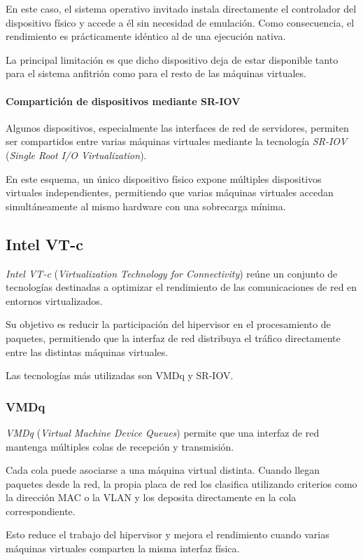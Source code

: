 En este caso, el sistema operativo invitado instala directamente el controlador del dispositivo físico y accede a él sin necesidad de emulación. Como consecuencia, el rendimiento es prácticamente idéntico al de una ejecución nativa.

La principal limitación es que dicho dispositivo deja de estar disponible tanto para el sistema anfitrión como para el resto de las máquinas virtuales.

\paragraph{Compartición de dispositivos mediante SR-IOV}
Algunos dispositivos, especialmente las interfaces de red de servidores, permiten ser compartidos entre varias máquinas virtuales mediante la tecnología \textit{SR-IOV} (\textit{Single Root I/O Virtualization}).

En este esquema, un único dispositivo físico expone múltiples dispositivos virtuales independientes, permitiendo que varias máquinas virtuales accedan simultáneamente al mismo hardware con una sobrecarga mínima.

\subsection{Intel VT-c}

\textit{Intel VT-c} (\textit{Virtualization Technology for Connectivity}) reúne un conjunto de tecnologías destinadas a optimizar el rendimiento de las comunicaciones de red en entornos virtualizados.

Su objetivo es reducir la participación del hipervisor en el procesamiento de paquetes, permitiendo que la interfaz de red distribuya el tráfico directamente entre las distintas máquinas virtuales.

Las tecnologías más utilizadas son VMDq y SR-IOV.

\subsubsection{VMDq}

\textit{VMDq} (\textit{Virtual Machine Device Queues}) permite que una interfaz de red mantenga múltiples colas de recepción y transmisión.

Cada cola puede asociarse a una máquina virtual distinta. Cuando llegan paquetes desde la red, la propia placa de red los clasifica utilizando criterios como la dirección MAC o la VLAN y los deposita directamente en la cola correspondiente.

Esto reduce el trabajo del hipervisor y mejora el rendimiento cuando varias máquinas virtuales comparten la misma interfaz física.

